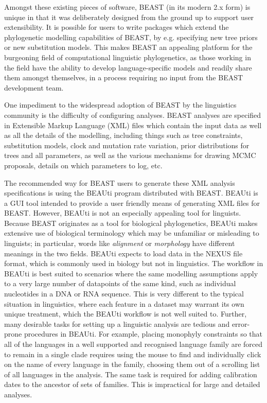 \documentclass[twocolumn,10pt]{scrartcl}
\begin{document}
Amongst these existing pieces of software, BEAST (in its modern 2.x form) is unique in that it was deliberately designed from the ground up to support user extensibility.  It is possible for users to write packages which extend the phylogenetic modelling capabilities of BEAST, by e.g. specifying new tree priors or new substitution models.  This makes BEAST an appealing platform for the burgeoning field of computational linguistic phylogenetics, as those working in the field have the ability to develop language-specific models and readily share them amongst themselves, in a process requiring no input from the BEAST development team.

One impediment to the widespread adoption of BEAST by the linguistics community is the difficulty of configuring analyses.  BEAST analyses are specified in Extensible Markup Language (XML) files which contain the input data as well as all the details of the modelling, including things such as tree constraints, substitution models, clock and mutation rate variation, prior distributions for trees and all parameters, as well as the various mechanisms for drawing MCMC proposals, details on which parameters to log, etc.

The recommended way for BEAST users to generate these XML analysis specifications is using the BEAUti program distributed with BEAST.  BEAUti is a GUI tool intended to provide a user friendly means of generating XML files for BEAST.  However, BEAUti is not an especially appealing tool for linguists.  Because BEAST originates as a tool for biological phylogenetics, BEAUti makes extensive use of biological terminology which may be unfamiliar or misleading to linguists; in particular, words like \emph{alignment} or \emph{morphology} have different meanings in the two fields.  BEAUti expects to load data in the NEXUS file format\cite{Maddison1997}, which is commonly used in biology but not in linguistics.  The workflow in BEAUti is best suited to scenarios where the same modelling assumptions apply to a very large number of datapoints of the same kind, such as individual nucleotides in a DNA or RNA sequence.  This is very different to the typical situation in linguistics, where each feature in a dataset may warrant its own unique treatment, which the BEAUti workflow is not well suited to.  Further, many desirable tasks for setting up a linguistic analysis are tedious and error-prone procedures in BEAUti.  For example, placing monophyly constraints so that all of the languages in a well supported and recognised language family are forced to remain in a single clade requires using the mouse to find and individually click on the name of every language in the family, choosing them out of a scrolling list of all languages in the analysis.  The same task is required for adding calibration dates to the ancestor of sets of families.  This is impractical for large and detailed analyses.
\end{document}
